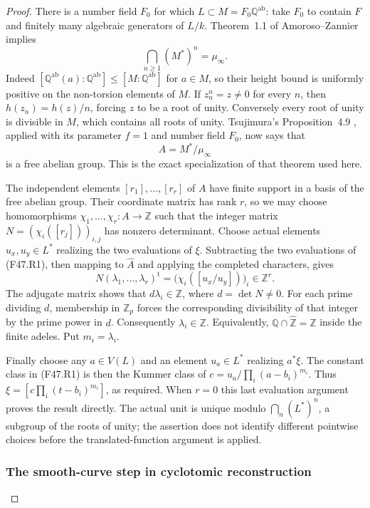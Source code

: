 \begin{proof}
There is a number field $F_0$ for which $L\subset M=F_0\mathbb
Q^{\mathrm{ab}}$: take $F_0$ to contain $F$ and finitely many algebraic
generators of $L/k$. Theorem~1.1 of Amoroso--Zannier \cite{AmorosoZannier2000} implies
\[
 \bigcap_{n\ge1}(M^*)^n=\mu_\infty.
                                                        \tag{F47.R3}
\]
Indeed $[\mathbb Q^{\mathrm{ab}}(a):\mathbb Q^{\mathrm{ab}}]
\le [M:\mathbb Q^{\mathrm{ab}}]$ for $a\in M$, so their height bound
is uniformly positive on the non-torsion elements of $M$. If
$z_n^n=z\ne0$ for every $n$, then $h(z_n)=h(z)/n$, forcing $z$ to be
a root of unity. Conversely every root of unity is divisible in $M$,
which contains all roots of unity. Tsujimura's Proposition~4.9 \cite{Tsujimura2022}, applied with its parameter $f=1$ and number field
$F_0$, now says that
\[
 A=M^*/\mu_\infty
\]
is a free abelian group. This is the exact specialization of that
theorem used here.

The independent elements $[r_1],\ldots,[r_r]$ of $A$ have finite
support in a basis of the free abelian group. Their coordinate matrix
has rank $r$, so we may choose homomorphisms
$\chi_1,\ldots,\chi_r:A\to\mathbb Z$ such that the integer matrix
$N=(\chi_i([r_j]))_{i,j}$ has nonzero determinant. Choose actual
elements $u_x,u_y\in L^*$ realizing the two evaluations of $\xi$.
Subtracting the two evaluations of (F47.R1), then mapping to
$\widehat A$ and applying the completed characters, gives
\[
 N(\lambda_1,\ldots,\lambda_r)^{\mathrm t}
   =\bigl(\chi_i([u_x/u_y])\bigr)_i\in\mathbb Z^r.
                                                        \tag{F47.R4}
\]
The adjugate matrix shows that
$d\lambda_i\in\mathbb Z$, where $d=\det N\ne0$.
For each prime dividing $d$, membership in $\mathbb Z_p$ forces the
corresponding divisibility of that integer by the prime power in $d$.
Consequently $\lambda_i\in\mathbb Z$. Equivalently,
$\mathbb Q\cap\widehat{\mathbb Z}=\mathbb Z$ inside the finite
adeles. Put $m_i=\lambda_i$.

Finally choose any $a\in V(L)$ and an element $u_a\in L^*$ realizing
$a^*\xi$. The constant class in (F47.R1) is then the Kummer class of
$c=u_a/\prod_i(a-b_i)^{m_i}$. Thus
$\xi=[c\prod_i(t-b_i)^{m_i}]$, as required. When $r=0$ this last
evaluation argument proves the result directly. The actual unit is
unique modulo $\bigcap_n(L^*)^n$, a subgroup of the roots of unity;
the assertion does not identify different pointwise choices before
the translated-function argument is applied.


\subsubsection*{The smooth-curve step in cyclotomic reconstruction}


\end{proof}
